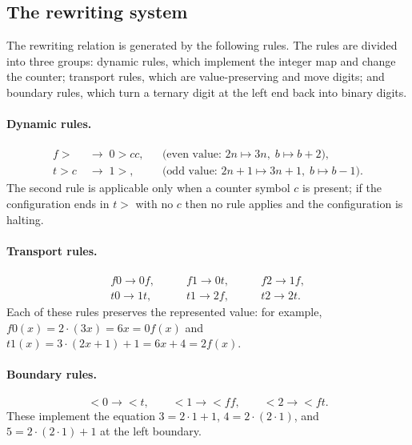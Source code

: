 \documentclass[11pt,a4paper]{article}
\theoremstyle{definition}
\newcommand{\lt}{<}
\newcommand{\gt}{>}
\begin{document}
\subsection{The rewriting system}
\label{subsec:rules}

The rewriting relation is generated by the following rules.  The
rules are divided into three groups: dynamic rules, which implement the
integer map and change the counter; transport rules, which are
value-preserving and move digits; and boundary rules, which turn a
ternary digit at the left end back into binary digits.

\paragraph{Dynamic rules.}
\begin{equation}
  \label{eq:dyn}
  \begin{aligned}
    f\gt &\;\longrightarrow\; 0\gt cc,
    &&\text{(even value: }2n\mapsto 3n,\; b\mapsto b+2\text{)},\\
    t\gt c &\;\longrightarrow\; 1\gt,
    &&\text{(odd value: }2n+1\mapsto 3n+1,\; b\mapsto b-1\text{)}.
  \end{aligned}
\end{equation}
The second rule is applicable only when a counter symbol $c$ is
present; if the configuration ends in $t\gt$ with no $c$ then no rule
applies and the configuration is halting.

\paragraph{Transport rules.}
\begin{equation}
  \label{eq:transport}
  \begin{array}{lll}
    f0\to 0f,\qquad & f1\to 0t,\qquad & f2\to 1f,\\
    t0\to 1t,\qquad & t1\to 2f,\qquad & t2\to 2t.
  \end{array}
\end{equation}
Each of these rules preserves the represented value: for example,
$f0(x)=2\cdot(3x)=6x=0f(x)$ and $t1(x)=3\cdot(2x+1)+1=6x+4=2f(x)$.

\paragraph{Boundary rules.}
\begin{equation}
  \label{eq:boundary}
  \lt 0\to\lt t,\qquad
  \lt 1\to\lt ff,\qquad
  \lt 2\to\lt ft.
\end{equation}
These implement the equation $3=2\cdot1+1$, $4=2\cdot(2\cdot1)$, and
$5=2\cdot(2\cdot1)+1$ at the left boundary.
\end{document}
